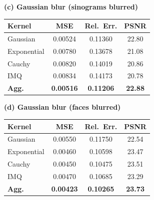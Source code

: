 \documentclass[twoside,11pt]{article}
\begin{document}
\begin{table}[t]
\begin{minipage}[t]{0.47\textwidth}
\centering
\textbf{(c) Gaussian blur (sinograms blurred)}\\[0.3em]
\begin{tabular}{lccc}
\toprule
Kernel & MSE & Rel.\ Err. & PSNR \\
\midrule
Gaussian     & 0.00524 & 0.11360 & 22.80 \\
Exponential  & 0.00780 & 0.13678 & 21.08 \\
Cauchy       & 0.00820 & 0.14019 & 20.86 \\
IMQ          & 0.00834 & 0.14173 & 20.78 \\
\midrule
\textbf{Agg.} & \textbf{0.00516} & \textbf{0.11206} & \textbf{22.88} \\
\bottomrule
\end{tabular}
\end{minipage}
\hfill
\begin{minipage}[t]{0.47\textwidth}
\centering
\textbf{(d) Gaussian blur (faces blurred)}\\[0.3em]
\begin{tabular}{lccc}
\toprule
Kernel & MSE & Rel.\ Err. & PSNR \\
\midrule
Gaussian     & 0.00550 & 0.11750 & 22.54 \\
Exponential  & 0.00460 & 0.10598 & 23.47 \\
Cauchy       & 0.00450 & 0.10475 & 23.51 \\
IMQ          & 0.00470 & 0.10685 & 23.29 \\
\midrule
\textbf{Agg.} & \textbf{0.00423} & \textbf{0.10265} & \textbf{23.73} \\
\bottomrule
\end{tabular}
\end{minipage}

\end{table}






\newpage
\end{document}
